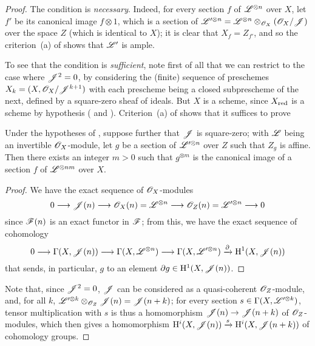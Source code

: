 \begin{proof}
The condition is \emph{necessary}.
Indeed, for every section $f$ of $\mathscr{L}^{\otimes n}$ over $X$, let $f'$ be its canonical image $f\otimes1$, which is a section of $\mathscr{L}'^{\otimes n}=\mathscr{L}^{\otimes n}\otimes_{\mathscr{O}_X}(\mathscr{O}_X/\mathscr{J})$ over the space $Z$ (which is identical to $X$);
it is clear that $X_f=Z_{f'}$, and so the criterion~(a) of  shows that $\mathscr{L}'$ is ample.

To see that the condition is \emph{sufficient}, note first of all that we can restrict to the case where $\mathscr{J}^2=0$, by considering the (finite) sequence of preschemes $X_k=(X,\mathscr{O}_X/\mathscr{J}^{k+1})$ with each prescheme being a closed subprescheme of the next, defined by a square-zero sheaf of ideals.
But $X$ is a scheme, since $X_{\mathrm{red}}$ is a scheme by hypothesis ( and ).
Criterion~(a) of  shows that it suffices to prove
  \begin{lemma}[4.5.13.1]
  \label{II.4.5.13.1}
  Under the hypotheses of , suppose further that $\mathscr{J}$ is square-zero;
  with $\mathscr{L}$ being an invertible $\mathscr{O}_X$-module, let $g$ be a section of $\mathscr{L}'^{\otimes n}$ over $Z$ such that $Z_g$ is affine.
  Then there exists an integer $m>0$ such that $g^{\otimes m}$ is the canonical image of a section $f$ of $\mathscr{L}^{\otimes nm}$ over $X$.
  \end{lemma}

  \begin{proof}
  We have the exact sequence of $\mathscr{O}_X$-modules
  \[
    0 \to \sh{J}(n) \to \sh{O}_X(n)=\sh{L}^{\otimes n} \to \sh{O}_Z(n)=\sh{L}'^{\otimes n} \to 0
  \]
  since $\mathscr{F}(n)$ is an exact functor in $\mathscr{F}$;
  from this, we have the exact sequence of cohomology
  \[
    0 \to \Gamma(X,\sh{J}(n)) \to \Gamma(X,\sh{L}^{\otimes n}) \to \Gamma(X,\sh{L}'^{\otimes n}) \xrightarrow{\partial} \HH^1(X,\sh{J}(n))
  \]
  that sends, in particular, $g$ to an element $\partial g\in\mathrm{H}^1(X,\mathscr{J}(n))$.
  \end{proof}

  Note that, since $\mathscr{J}^2=0$, $\mathscr{J}$ can be considered as a quasi-coherent $\mathscr{O}_Z$-module, and, for all $k$, $\mathscr{L}'^{\otimes k}\otimes_{\mathscr{O}_Z}\mathscr{J}(n)=\mathscr{J}(n+k)$;
  for every section $s\in\Gamma(X,\mathscr{L}'^{\otimes k})$, tensor multiplication with $s$ is thus a homomorphism $\sh{J}(n)\to\sh{J}(n+k)$ of $\mathscr{O}_Z$-modules, which then gives a homomorphism $\mathrm{H}^i(X,\mathscr{J}(n))\xrightarrow{s}\mathrm{H}^i(X,\mathscr{J}(n+k))$ of cohomology groups.


\end{proof}
